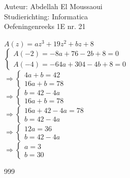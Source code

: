 \documentclass[a4paper]{article}
\begin{document}
  
\noindent \large Auteur: Abdellah El Moussaoui \\
\noindent \large Studierichting: Informatica\\
\noindent \large Oefeningenreeks 1E nr. 21\\

\medskip

\normalsize

\medskip

$A(z)=az^3+19z^2+bz+8$\\

$\left\{
\begin{array}{l}
A(-2)=-8a+76-2b+8=0\\
A(-4)=-64a+304-4b+8=0
\end{array}
\right.$\\

$\Rightarrow
\left\{
\begin{array}{l}
4a+b=42\\
16a+b=78
\end{array}
\right.$\\

$\Rightarrow
\left\{
\begin{array}{l}
b=42-4a\\
16a+b=78
\end{array}
\right.$\\

$\Rightarrow
\left\{
\begin{array}{l}
16a+42-4a=78\\
b=42-4a
\end{array}
\right.$\\

$\Rightarrow
\left\{
\begin{array}{l}
12a=36\\
b=42-4a
\end{array}
\right.$\\

$\Rightarrow \boxed{
\left\{
\begin{array}{l}
a=3\\
b=30
\end{array}
\right.}$\\


\begin{thebibliography}{999}
\end{thebibliography}
\end{document}
